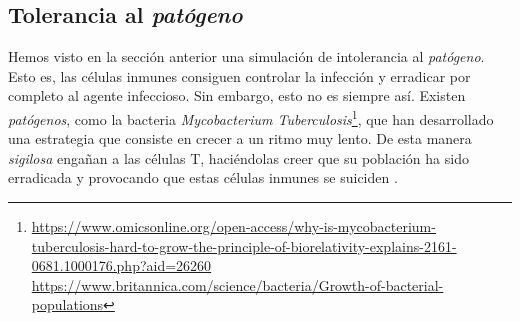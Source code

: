 %		
%



\subsection{Tolerancia al \textit{patógeno}}
\label{sim:toler}

Hemos visto en la sección anterior una simulación de intolerancia al \textit{patógeno}. Esto es, las células inmunes consiguen controlar la infección y erradicar por completo al agente infeccioso. Sin embargo, esto no es siempre así. Existen \textit{patógenos}, como la bacteria \textit{Mycobacterium Tuberculosis}\footnote{\url{https://www.omicsonline.org/open-access/why-is-mycobacterium-tuberculosis-hard-to-grow-the-principle-of-biorelativity-explains-2161-0681.1000176.php?aid=26260} \\ \url{https://www.britannica.com/science/bacteria/Growth-of-bacterial-populations}}, que han desarrollado una estrategia que consiste en crecer a un ritmo muy lento. De esta manera \textit{sigilosa} engañan a las células T, haciéndolas creer que su población ha sido erradicada y provocando que estas células inmunes se suiciden  \citep{leggett2017growth}.

